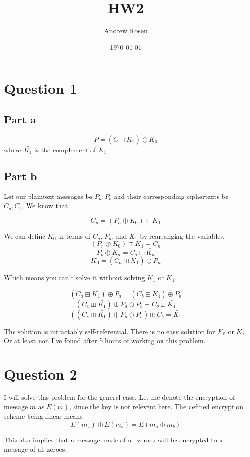 \documentclass[a4paper,10pt]{article}
\title{HW2}
\author{Andrew Rosen}
\date{\today}
\begin{document}
\maketitle
\section{Question 1}

\subsection{Part a}
$$P = (C \boxplus \bar{K_{1}}) \oplus K_{0}$$ where $\bar{K_{1}}$ is the complement of $K_{1}$. 
\subsection{Part b}
Let our plaintext messages be $P_{a}, P_{b} $ and their corresponding ciphertexts be $C_{a}, C_{b}$.  We know that

$$ C_{n} = (P_{n} \oplus K_{0}) \boxplus K_{1} $$

We can define $K_{0}$ in terms of $C_{a}$, $P_{a}$, and $K_{1}$ by rearranging the variables.   
$$ (P_{n} \oplus K_{0}) \boxplus K_{1}  = C_{n} $$
$$  P_{a} \oplus K_{n} = C_{a} \boxplus \bar{K_{n}} $$
$$  K_{0} = (C_{n} \boxplus \bar{K_{1}}) \oplus P_{n} $$

Which means you can't solve it without solving $\bar{K_{1}}$ or ${K_{1}}$.

$$(C_{a} \boxplus \bar{K_{1}}) \oplus P_{a} = (C_{b} \boxplus \bar{K_{1}}) \oplus P_{b} $$
$$(C_{a} \boxplus \bar{K_{1}}) \oplus P_{a} \oplus P_{b} = C_{b} \boxplus \bar{K_{1}}$$
$$\left(\left(C_{a} \boxplus \bar{K_{1}}\right) \oplus P_{a} \oplus P_{b}\right) \boxplus C_{b} =  \bar{K_{1}}$$

The solution is intractably self-referential.  There is no easy solution for $K_{0}$ or $K_{1}$.  Or at least non I've found after 5 hours of working on this problem.
\pagebreak

\section{Question 2}

I will solve this problem for the general case.  Let me denote the encryption of message $m$ as $E(m)$, since the key is not relevent here.  The defined encryption scheme being linear means 
$$E(m_{a}) \oplus E(m_{b})  =  E(m_{a} \oplus m_{b})$$

This also implies that a message made of all zeroes will be encrypted to a message of all zeroes.
\end{document}
